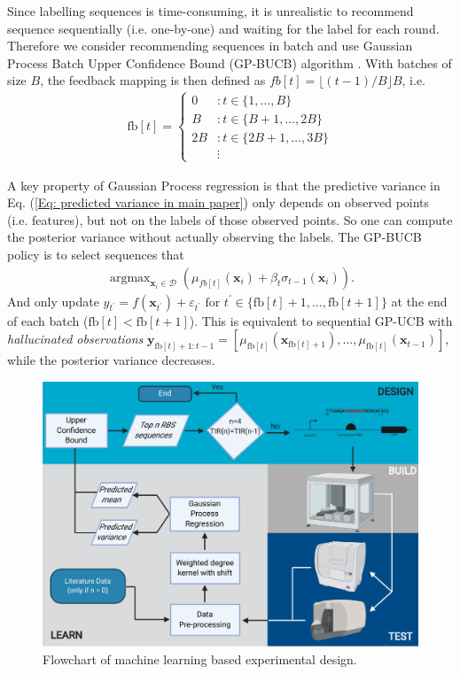 Since labelling sequences is time-consuming, it is unrealistic to recommend sequence sequentially (i.e. one-by-one) and waiting for the label for each round.
Therefore we consider recommending sequences in batch and use Gaussian Process Batch Upper Confidence Bound (GP-BUCB) algorithm  \cite{desautels2012parallelizing}.
With batches of size $B$, the feedback mapping is then defined as $fb[t] = \lfloor(t-1) / B\rfloor B$, i.e. 
\begin{align}
    \mathrm{fb}[t]=\left\{\begin{array}{cl}
    0 & : t \in\{1, \ldots, B\} \\
    B & : t \in\{B+1, \ldots, 2 B\} \\
    2 B & : t \in\{2 B+1, \ldots, 3 B\} \\
    & \vdots
    \end{array}\right.
\end{align}


A key property of Gaussian Process regression is that the predictive variance in Eq. (\ref{Eq: predicted variance in main paper}) only depends on observed points (i.e. features), but not on the labels of those observed points. 
So one can compute the posterior variance without actually observing the labels. 
The GP-BUCB policy is to select sequences that
\begin{align}
    \operatorname{argmax}_{\mathbf{x}_i \in \mathcal{D}} \left( \mu_{fb[t]}(\mathbf{x}_i) + \beta_t \sigma_{t-1}(\mathbf{x}_i)\right).
\end{align}
And only update $y_{t^{\prime}}=f\left(\boldsymbol{x}_{t^{\prime}}\right)+\varepsilon_{t^{\prime}} \text { for } t^{\prime} \in\{\mathrm{fb}[t]+1, \ldots, \mathrm{fb}[t+1]\}$ at the end of each batch ($\mathrm{fb}[t]<\mathrm{fb}[t+1]$). 
This is equivalent to sequential GP-UCB with \textit{hallucinated observations} $\boldsymbol{y}_{\mathrm{fb}[t]+1: t-1}=\left[\mu_{\mathrm{fb}[t]}\left(\boldsymbol{x}_{\mathrm{fb}[t]+1}\right), \ldots, \mu_{\mathrm{fb}[t]}\left(\boldsymbol{x}_{t-1}\right)\right]$, while the posterior variance decreases. 


\begin{figure}[t]
    \centering
    \includegraphics[scale=0.7]{plots/flowchart.pdf}
    \caption{Flowchart of machine learning based experimental design.}
    \label{fig: flowchart of machine learning based experimental design.}
\end{figure}





